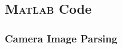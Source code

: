 \subsection{\textsc{Matlab} Code}
\subsubsection{Camera Image Parsing} \label{camTestMatlab}
\singlespacing

\doublespacing